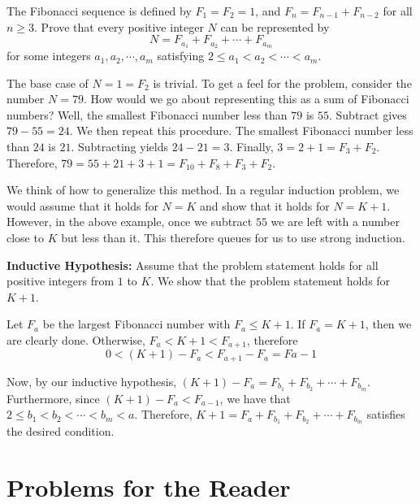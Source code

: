 \begin{exmp}  The Fibonacci sequence is defined by $F_{1}=F_2=1$, and $F_n=F_{n-1}+F_{n-2}$ for all $n\ge 3$.  Prove that every positive integer $N$ can be represented by $$N=F_{a_1}+F_{a_2}+\cdots+F_{a_m}$$ for some integers $a_1, a_2, \cdots, a_m$ satisfying $2\le a_1<a_2<\cdots<a_m$.  \end{exmp}
\begin{soln}  The base case of $N=1=F_2$ is trivial.  To get a feel for the problem, consider the number $N=79$.  How would we go about representing this as a sum of Fibonacci numbers?  Well, the smallest Fibonacci number less than $79$ is $55$.  Subtract gives $79-55=24$.  We then repeat this procedure.  The smallest Fibonacci number less than $24$ is $21$.  Subtracting yields $24-21=3$.  Finally, $3=2+1=F_3+F_2$.  Therefore, $79=55+21+3+1=F_{10}+F_8+F_3+F_2$.  

We think of how to generalize this method.  In a regular induction problem, we would assume that it holds for $N=K$ and show that it holds for $N=K+1$. However, in the above example, once we subtract $55$ we are left with a number close to $K$ but less than it.  This therefore queues for us to use strong induction.  

\textbf{Inductive Hypothesis:}  Assume that the problem statement holds for all positive integers from $1$ to $K$.  We show that the problem statement holds for $K+1$.

Let $F_a$ be the largest Fibonacci number with $F_a\le K+1$.  If $F_a=K+1$, then we are clearly done.  Otherwise, $F_a<K+1<F_{a+1}$, therefore $$0<(K+1)-F_a<F_{a+1}-F_a=F{a-1}$$

Now, by our inductive hypothesis, $(K+1)-F_a=F_{b_1}+F_{b_2}+\cdots+F_{b_m}$.  Furthermore, since $(K+1)-F_a<F_{a-1}$, we have that $2\le b_1<b_2<\cdots<b_m<a$.  Therefore, $K+1=F_a+F_{b_1}+F_{b_2}+\cdots+F_{b_m}$ satisfies the desired condition.  \end{soln}


\section{Problems for the Reader}

